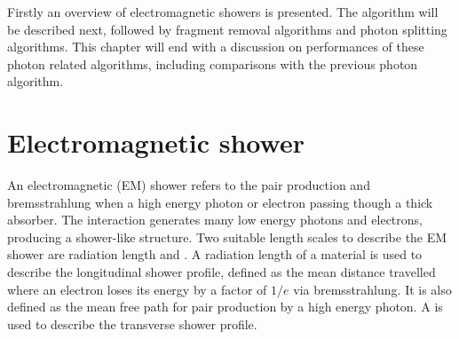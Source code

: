 
Firstly an overview of electromagnetic showers is presented. The \PhotonReconstruction algorithm will be described next, followed by fragment removal algorithms and photon splitting algorithms. This chapter will end with a discussion on performances of these photon related algorithms,  including comparisons with the previous photon algorithm.



\section{Electromagnetic shower}
\label{sec:photonEMshower}
An electromagnetic (EM) shower refers to the pair production and bremsstrahlung when a high energy photon or electron passing though a thick absorber. The interaction generates many low energy photons and electrons, producing a shower-like  structure. Two suitable length scales to describe the EM shower are radiation length and \RM. A radiation length of a material is used to describe the longitudinal shower profile, defined as the mean distance travelled where an electron loses its energy by a factor of $1/e$ via bremsstrahlung. It is also defined as the mean free path  for pair production by a high energy photon\cite{segre1977nuclei}. A \RM is used to describe the transverse shower profile.

